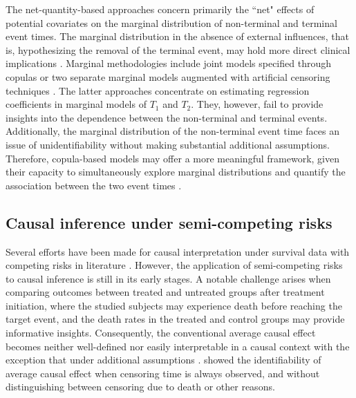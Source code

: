 \documentclass[12pt]{article}
\theoremstyle{plain}
\begin{document}
The net-quantity-based approaches concern primarily the ``net" effects of potential covariates on the marginal distribution of non-terminal and terminal event times. The marginal distribution in the absence of external influences, that is, hypothesizing the removal of the terminal event, may hold more direct clinical implications \citep{varadhan2014semicompeting}. Marginal methodologies include joint models specified through copulas \citep{peng2007semicompeting,chen2012semicompeting,peng2018semicompeting} or two separate marginal models augmented with artificial censoring techniques \citep{peng2006artificial,Ding2009artificial}. 
The latter approaches concentrate on estimating regression coefficients in marginal models of $T_1$ and $T_2$.
They, however, fail to provide insights into the dependence between the non-terminal and terminal events. 
Additionally, the marginal distribution of the non-terminal event time faces an issue of unidentifiability without making substantial additional assumptions.  
Therefore, copula-based models may offer a more meaningful framework, given their capacity to simultaneously explore marginal distributions and quantify the association between the two event times \citep{emura2021conditional,sun2023penalised,wei2023bivariate,yu2023unified}.

\subsection{Causal inference under semi-competing risks}

Several efforts have been made for causal interpretation under survival data with competing risks in literature \citep{young2020,stensrud2021generalized,stensrud2022}. %
However, the application of semi-competing risks to causal inference is still in its early stages. A notable challenge arises when comparing outcomes between treated and untreated groups after treatment initiation, where the studied subjects may experience death before reaching the target event, and the death rates in the treated and control groups may provide informative insights. Consequently, the conventional average causal effect becomes neither well-defined nor easily interpretable in a causal context with the exception that under additional assumptions  \citep{Nevo2022semicompeting, axelrod2022sensitivity}. \cite{robins1995analytic} showed the identifiability of average causal effect when censoring time is always observed, and without distinguishing between censoring due to death or other reasons. 
\end{document}
